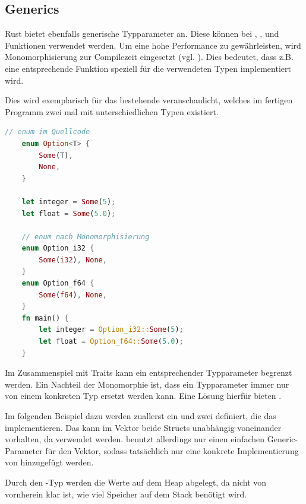 \documentclass[11pt,a4paper, ngerman]{article}
\begin{document}
\subsection{Generics}
Rust bietet ebenfalls generische Typparameter an. Diese können bei , ,  und Funktionen verwendet werden. Um eine hohe Performance zu gewährleisten, wird Monomorphisierung zur Compilezeit eingesetzt (vgl. \cite[S. 196 ff.]{SK19}). Dies bedeutet, dass z.B. eine entsprechende Funktion speziell für die verwendeten Typen implementiert wird.

Dies wird exemplarisch für das bestehende   veranschaulicht, welches im fertigen Programm zwei mal mit unterschiedlichen Typen existiert.

\begin{lstlisting}[language=rust, caption={Monomorphisierung Veranschaulichung \cite{MonoCodeEx}}]
    // enum im Quellcode
    enum Option<T> {
        Some(T),
        None,
    }

    let integer = Some(5);
    let float = Some(5.0);
    
    // enum nach Monomorphisierung
    enum Option_i32 {
        Some(i32), None,
    }
    enum Option_f64 {
        Some(f64), None,
    }
    fn main() {
        let integer = Option_i32::Some(5);
        let float = Option_f64::Some(5.0);
    }
\end{lstlisting}

Im Zusammenspiel mit Traits kann ein entsprechender Typparameter begrenzt werden. Ein Nachteil der Monomorphie ist, dass ein Typparameter immer nur von einem konkreten Typ ersetzt werden kann. Eine Lösung hierfür bieten .

Im folgenden Beispiel dazu werden zuallerst ein  und zwei  definiert, die das  implementieren. Das  kann im Vektor  beide Structs unabhängig voneinander vorhalten, da  verwendet werden.  benutzt allerdings nur einen einfachen Generic-Parameter für den Vektor, sodass tatsächlich nur eine konkrete Implementierung von  hinzugefügt werden.

Durch den -Typ werden die Werte auf dem Heap abgelegt, da nicht von vornherein klar ist, wie viel Speicher auf dem Stack benötigt wird.
\end{document}
